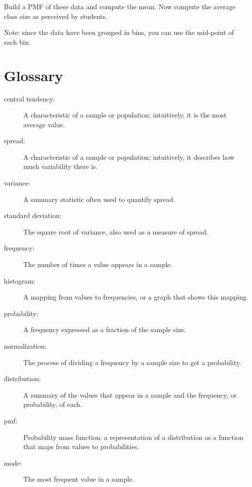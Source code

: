 \documentclass[12pt]{book}
\begin{document}
\begin{ex}
Build a PMF of these data and compute the mean.  Now compute the
average class size as perceived by students.

Note: since the data have been grouped in bins, you can use the
mid-point of each bin.
\end{ex}


\section{Glossary}

\begin{description}

\item[central tendency:] A characteristic of a sample or population;
intuitively, it is the most average value. 

\item[spread:] A characteristic of a sample or population;
intuitively, it describes how much variability there is.

\item[variance:] A summary statistic often used to quantify spread.

\item[standard deviation:] The square root of variance, also used
as a measure of spread.

\item[frequency:] The number of times a value appears in a sample.

\item[histogram:] A mapping from values to frequencies, or a graph
that shows this mapping.

\item[probability:] A frequency expressed as a fraction of the sample
size.

\item[normalization:] The process of dividing a frequency by a sample
size to get a probability.

\item[distribution:] A summary of the values that appear in a sample
and the frequency, or probability, of each.

\item[pmf:] Probability mass function: a representation of a distribution
as a function that maps from values to probabilities.

\item[mode:] The most frequent value in a sample.


\end{description}
\end{document}
